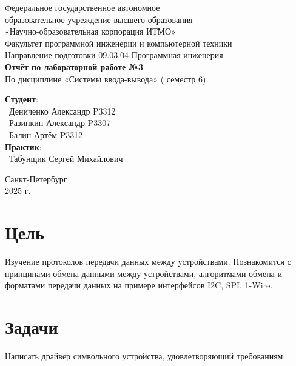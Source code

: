 \documentclass{article}
\begin{document}
\begin{center}
    \Large
    Федеральное государственное автономное \\
    образовательное учреждение высшего образования \\ 
    «Научно-образовательная корпорация ИТМО»\\
    \vspace{0.5cm}
    \large
    Факультет программной инженерии и компьютерной техники \\
    Направление подготовки 09.03.04 Программная инженерия \\
    \vspace{1cm}
    \Large
    \textbf{Отчёт по лабораторной работе №3} \\
        По дисциплине «Системы ввода-вывода» ( семестр 6)\\
    \large
    \vspace{8cm}

    \begin{minipage}{.33\textwidth}
    \end{minipage}
    \hfill
    \begin{minipage}{.4\textwidth}
    
        \textbf{Студент}: \vspace{.1cm} \\
        \ Дениченко Александр P3312\\
        \ Разинкин Александр P3307\\
        \ Балин Артём P3312\\
        \textbf{Практик}:  \\
        \ Табунщик Сергей Михайлович
    \end{minipage}
    \vfill
Санкт-Петербург\\ 2025 г.
\end{center}
\pagestyle{empty}
\newpage
\pagestyle{plain}

\section*{Цель}
Изучение протоколов передачи данных между устройствами.
Познакомится с принципами обмена данными между
устройствами, алгоритмами обмена и форматами передачи данных на
примере интерфейсов I2C, SPI, 1-Wire.
\section{Задачи}
Написать драйвер символьного устройства, удовлетворяющий
требованиям:
\end{document}
